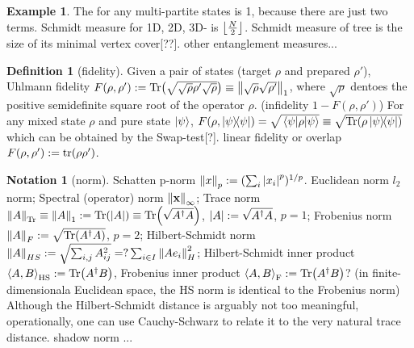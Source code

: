 \documentclass[
aps,
pra,
twocolumn,
floatfix,
]{revtex4-2}
\theoremstyle{plain}
\theoremstyle{definition}
\newtheorem{definition}{Definition}
\newtheorem{notation}{Notation}
\newtheorem{example}{Example}
\newcommand{\dm}{\rho}
\begin{document}
\begin{example}
	The  for any multi-partite  states is 1, because there are just two terms.
	Schmidt measure for 1D, 2D, 3D- is $\left\lfloor \frac{N}{2} \right\rfloor$.
	Schmidt measure of tree is the size of its minimal vertex cover[??].
	other entanglement measures...
\end{example}

\begin{definition}[fidelity]\label{def:fidelity}
	Given a pair of states (target $\dm$ and prepared $\dm'$), 
	Uhlmann fidelity $F(\dm,\dm') : = \Tr(\sqrt{\sqrt{\dm}\dm'\sqrt{\dm}})\equiv\norm{\sqrt{\dm}\sqrt{\dm'}}_1$, where $\sqrt{\dm}$ dentoes the positive semidefinite square root of the operator $\dm$. (infidelity $1-F(\dm,\dm')$)
	For any mixed state $\rho$ and pure state $\ket{\psi}$, $F(\dm,\op{\psi})=\sqrt{\mel{\psi}{\dm}{\psi}}\equiv \sqrt{\Tr(\dm\op{\psi})}$ which can be obtained by the Swap-test[?].
	linear fidelity or overlap $F(\dm,\dm'):=\tr(\dm\dm')$.
\end{definition}
\begin{notation}[norm]\label{def:norm}
	Schatten p-norm $\norm{x}_p:= (\sum_i \abs{x_i}^p)^{1/p}$.
	Euclidean norm $l_2$ norm;
	Spectral (operator) norm $\norm{\vb{x}}_{\infty}$;
	Trace norm $\norm{A}_{\Tr}\equiv\norm{A}_{1}:=\Tr(\abs{A})\equiv\Tr(\sqrt{A^\dagger A})$, $\abs{A}:=\sqrt{A^\dagger A}$, $p=1$;
	Frobenius norm $\norm{A}_{F}:=\sqrt{\Tr(A^\dagger A)}$, $p=2$;
	Hilbert-Schmidt norm $\norm{A}_{HS}:=\sqrt{\sum_{i,j} A_{ij}^2 }=?\sum_{i\in I}\norm{Ae_i}_H^2$;
	Hilbert-Schmidt inner product $\expval{A,B}_{\textup{HS}}:=\Tr(A^\dagger B)$,
	Frobenius inner product $\expval{A,B}_{\textup{F}}:=\Tr(A^\dagger B)$?
	(in finite-dimensionala Euclidean space, the HS norm is identical to the Frobenius norm)
	Although the Hilbert-Schmidt distance is arguably not too meaningful, operationally, one can use Cauchy-Schwarz to relate it to the very natural trace distance. 
	shadow norm ...
\end{notation}
\end{document}
